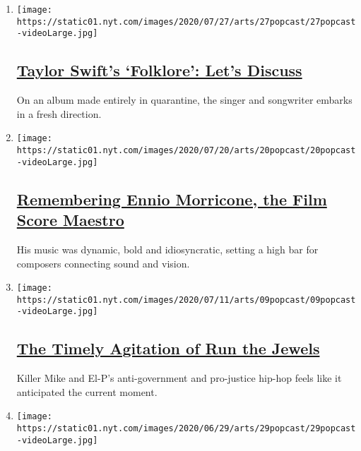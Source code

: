 \begin{enumerate}
\def\labelenumi{\arabic{enumi}.}
\item
  \texttt{[image: https://static01.nyt.com/images/2020/07/27/arts/27popcast/27popcast-videoLarge.jpg]}

  \hypertarget{taylor-swifts-folklore-lets-discuss}{%
  \subsection{\texorpdfstring{\href{/2020/07/27/arts/music/popcast-taylor-swift-folklore.html}{Taylor
  Swift's `Folklore': Let's
  Discuss}}{Taylor Swift's `Folklore': Let's Discuss}}\label{taylor-swifts-folklore-lets-discuss}}

  On an album made entirely in quarantine, the singer and songwriter
  embarks in a fresh direction.
\item
  \texttt{[image: https://static01.nyt.com/images/2020/07/20/arts/20popcast/20popcast-videoLarge.jpg]}

  \hypertarget{remembering-ennio-morricone-the-film-score-maestro}{%
  \subsection{\texorpdfstring{\href{/2020/07/20/arts/music/popcast-ennio-morricone.html}{Remembering
  Ennio Morricone, the Film Score
  Maestro}}{Remembering Ennio Morricone, the Film Score Maestro}}\label{remembering-ennio-morricone-the-film-score-maestro}}

  His music was dynamic, bold and idiosyncratic, setting a high bar for
  composers connecting sound and vision.
\item
  \texttt{[image: https://static01.nyt.com/images/2020/07/11/arts/09popcast/09popcast-videoLarge.jpg]}

  \hypertarget{the-timely-agitation-of-run-the-jewels}{%
  \subsection{\texorpdfstring{\href{/2020/07/09/arts/music/popcast-run-the-jewels.html}{The
  Timely Agitation of Run the
  Jewels}}{The Timely Agitation of Run the Jewels}}\label{the-timely-agitation-of-run-the-jewels}}

  Killer Mike and El-P's anti-government and pro-justice hip-hop feels
  like it anticipated the current moment.
\item
  \texttt{[image: https://static01.nyt.com/images/2020/06/29/arts/29popcast/29popcast-videoLarge.jpg]}


\end{enumerate}
